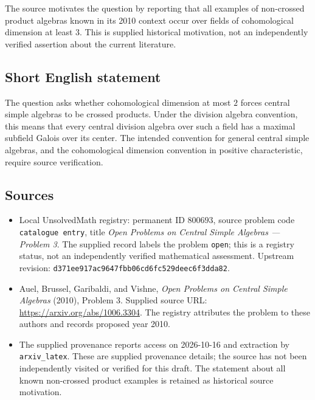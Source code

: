 \documentclass[11pt]{article}
\begin{document}
The source motivates the question by reporting that all examples of non-crossed product algebras known in its 2010 context occur over fields of cohomological dimension at least \(3\). This is supplied historical motivation, not an independently verified assertion about the current literature.
\subsection{Short English statement}
The question asks whether cohomological dimension at most \(2\) forces central simple algebras to be crossed products. Under the division algebra convention, this means that every central division algebra over such a field has a maximal subfield Galois over its center. The intended convention for general central simple algebras, and the cohomological dimension convention in positive characteristic, require source verification.
\subsection{Sources}
\begin{itemize}
\item Local UnsolvedMath registry: permanent ID \(800693\), source problem code \texttt{catalogue entry}, title \emph{Open Problems on Central Simple Algebras --- Problem 3}. The supplied record labels the problem \texttt{open}; this is a registry status, not an independently verified mathematical assessment. Upstream revision: \texttt{d371ee917ac9647fbb06cd6fc529deec6f3dda82}.
\item Auel, Brussel, Garibaldi, and Vishne, \emph{Open Problems on Central Simple Algebras} (2010), Problem 3. Supplied source URL: \url{https://arxiv.org/abs/1006.3304}. The registry attributes the problem to these authors and records proposed year 2010.
\item The supplied provenance reports access on 2026-10-16 and extraction by \texttt{arxiv\_latex}. These are supplied provenance details; the source has not been independently visited or verified for this draft. The statement about all known non-crossed product examples is retained as historical source motivation.
\end{itemize}
\end{document}
